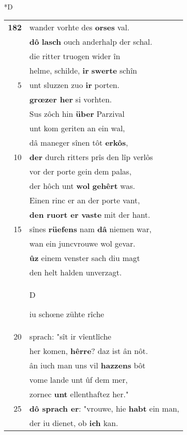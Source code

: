 \documentclass[8pt,a4paper,notitlepage]{article}
\begin{document}
\begin{table}[ht]
\begin{minipage}[t]{0.5\linewidth}
\small
\begin{center}*D
\end{center}
\begin{tabular}{rl}
\textbf{182} & wander vorhte des \textbf{orses} val.\\ 
 & \textbf{dô} \textbf{lasch} ouch anderhalp der schal.\\ 
 & die ritter truogen wider în\\ 
 & helme, schilde, \textbf{ir} \textbf{swerte} schîn\\ 
5 & unt sluzzen zuo \textbf{ir} porten.\\ 
 & \textbf{grœzer her} si vorhten.\\ 
 & Sus zôch hin \textbf{über} Parzival\\ 
 & unt kom geriten an ein wal,\\ 
 & dâ maneger sînen tôt \textbf{erkôs},\\ 
10 & \textbf{der} durch ritters prîs den lîp verlôs\\ 
 & vor der porte gein dem palas,\\ 
 & der hôch unt \textbf{wol} \textbf{gehêrt} was.\\ 
 & Einen rinc er an der porte vant,\\ 
 & \textbf{den ruort er vaste} mit der hant.\\ 
15 & sînes \textbf{rüefens} nam \textbf{dâ} niemen war,\\ 
 & wan ein juncvrouwe wol gevar.\\ 
 & \textbf{ûz} einem venster sach diu magt\\ 
 & den helt halden unverzagt.\\ 
 & \begin{large}D\end{large}iu schœne zühte rîche\\ 
20 & sprach: "sît ir vîentlîche\\ 
 & her komen, \textbf{hêrre}? daz ist ân nôt.\\ 
 & ân iuch man uns vil \textbf{hazzens} bôt\\ 
 & vome lande unt ûf dem mer,\\ 
 & zornec \textbf{unt} ellenthaftez her."\\ 
25 & \textbf{dô sprach er}: "vrouwe, hie \textbf{habt} ein man,\\ 
 & der iu dienet, ob \textbf{ich} kan.\\ 

\end{tabular}
\end{minipage}
\end{table}
\end{document}
